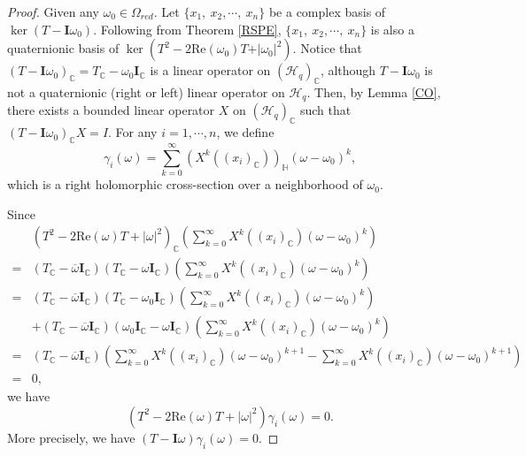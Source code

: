 \documentclass[pdflatex,sn-mathphys-num]{sn-jnl}%
\theoremstyle{thmstyleone}%
\theoremstyle{thmstyletwo}%
\theoremstyle{thmstylethree}%
\theoremstyle{definition}
\theoremstyle{remark}
\begin{document}
\begin{proof}
Given any $\omega_0\in \Omega_{red}$. Let $\{x_1,\ x_2,\cdots,\ x_n\}$ be a complex basis of $\ker(T-\boldsymbol{I}\omega_0)$. Following from Theorem \ref{RSPE}, $\{x_1,\ x_2,\cdots,\ x_n\}$ is also a quaternionic basis of $\ker(T^2-2\mathrm{Re}(\omega_0)T+\vert\omega_0\vert^2)$.
Notice that $(T-\boldsymbol{I}\omega_0)_{\mathbb{C}}=T_{\mathbb{C}}-\omega_0\boldsymbol{I}_{\mathbb{C}}$ is a linear operator on $(\mathcal{H}_q)_{\mathbb{C}}$, although $T-\boldsymbol{I}\omega_0$ is not a quaternionic (right or left) linear operator on $\mathcal{H}_{q}$.
Then, by Lemma \ref{CO}, there exists a bounded linear operator $X$ on $(\mathcal{H}_q)_{\mathbb{C}}$ such that $(T-\boldsymbol{I}\omega_0)_{\mathbb{C}}X=I$.
For any $i=1,\cdots, n$, we define
\[
\gamma_i(\omega)=\sum_{k=0}^{\infty}(X^k((x_i)_{\mathbb{C}}))_{\mathbb{H}}(\omega-\omega_0)^{k},
\]
which is a right holomorphic cross-section over a neighborhood of $\omega_0$.

Since
\[
\begin{aligned}
    & (T^2-2\mathrm{Re}(\omega)T+|\omega|^2)_{\mathbb{C}}(\sum_{k=0}^{\infty}X^k((x_i)_{\mathbb{C}})(\omega-\omega_0)^k) \\
    = & (T_{\mathbb{C}}-\overline{\omega}\boldsymbol{I}_{\mathbb{C}})(T_{\mathbb{C}}-\omega\boldsymbol{I}_{\mathbb{C}})(\sum_{k=0}^{\infty}X^k((x_i)_{\mathbb{C}})(\omega-\omega_0)^k) \\
    = & (T_{\mathbb{C}}-\overline{\omega}\boldsymbol{I}_{\mathbb{C}})(T_{\mathbb{C}}-\omega_0\boldsymbol{I}_{\mathbb{C}})(\sum_{k=0}^{\infty}X^k((x_i)_{\mathbb{C}})(\omega-\omega_0)^k) \\
    &+(T_{\mathbb{C}}-\overline{\omega}\boldsymbol{I}_{\mathbb{C}})(\omega_0\boldsymbol{I}_{\mathbb{C}}-\omega\boldsymbol{I}_{\mathbb{C}})(\sum_{k=0}^{\infty}X^k((x_i)_{\mathbb{C}})(\omega-\omega_0)^k) \\
    = & (T_{\mathbb{C}}-\overline{\omega}\boldsymbol{I}_{\mathbb{C}})\left(\sum_{k=0}^{\infty}X^k((x_i)_{\mathbb{C}})(\omega-\omega_0)^{k+1}-\sum_{k=0}^{\infty}X^k((x_i)_{\mathbb{C}})(\omega-\omega_0)^{k+1}\right) \\
    = & 0,
\end{aligned}
\]
we have
\[
(T^2-2\mathrm{Re}(\omega)T+|\omega|^2)\gamma_i(\omega)=0.
\]
More precisely, we have $(T-\boldsymbol{I}\omega)\gamma_i(\omega)=0$.


\end{proof}
\end{document}
